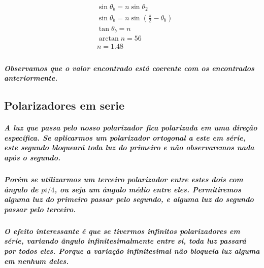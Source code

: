\documentclass[12pt,twoside, a4paper, twocolumn]{article}
\begin{document}
\begin{equation*}
  \begin{aligned}
     & \sin{\theta_b} = n \sin{\theta_2}                              \\
     & \sin{\theta_b} = n \sin{\left(\frac{\pi}{2} - \theta_b\right)} \\
     & \tan{\theta_b} = n                                             \\
     & \arctan{n} = 56                                                \\
     & n = 1.48                                                       \\
  \end{aligned}
\end{equation*}

\subparagraph*{Observamos que o valor encontrado está coerente com os encontrados anteriormente.}

\subsection{Polarizadores em serie}

\subparagraph*{A luz que passa pelo nosso polarizador fica polarizada em uma direção específica. Se aplicarmos um polarizador ortogonal a este em série, este segundo bloqueará toda luz do primeiro e não observaremos nada após o segundo. }

\subparagraph*{Porém se utilizarmos um terceiro polarizador entre estes dois com ângulo de $pi/4$, ou seja um ângulo médio entre eles. Permitiremos alguma luz do primeiro passar pelo segundo, e alguma luz do segundo passar pelo terceiro.}

\subparagraph*{O efeito interessante é que se tivermos infinitos polarizadores em série, variando ângulo infinitesimalmente entre si, toda luz passará por todos eles. Porque a variação infinitesimal não bloqueia luz alguma em nenhum deles.}
\end{document}

